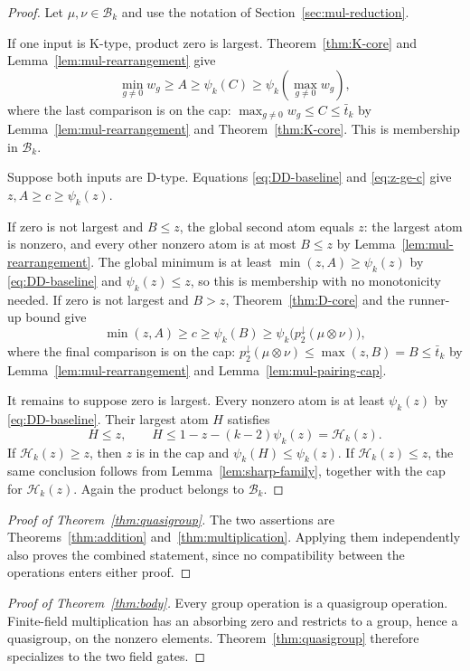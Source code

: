 \documentclass[11pt]{article}
\theoremstyle{definition}
\theoremstyle{remark}
\newcommand{\body}{\mathcal{B}}
\newcommand{\down}{\downarrow}
\begin{document}
\begin{proof}
Let $\mu,\nu\in\body_k$ and use the notation of
Section~\ref{sec:mul-reduction}.

If one input is K-type, product zero is largest.  Theorem~\ref{thm:K-core}
and Lemma~\ref{lem:mul-rearrangement} give
\[
 \min_{g\ne0}w_g\ge A\ge\psi_k(C)
 \ge\psi_k\left(\max_{g\ne0}w_g\right),
\]
where the last comparison is on the cap:
$\max_{g\ne0}w_g\le C\le\bar t_k$ by Lemma~\ref{lem:mul-rearrangement}
and Theorem~\ref{thm:K-core}.  This is membership in $\body_k$.

Suppose both inputs are D-type.  Equations \eqref{eq:DD-baseline} and
\eqref{eq:z-ge-c} give $z,A\ge c\ge\psi_k(z)$.

If zero is not largest and $B\le z$, the global second atom equals $z$:
the largest atom is nonzero, and every other nonzero atom is at most
$B\le z$ by Lemma~\ref{lem:mul-rearrangement}.  The global minimum is at
least $\min(z,A)\ge\psi_k(z)$ by \eqref{eq:DD-baseline} and
$\psi_k(z)\le z$, so this is membership with no monotonicity needed.
If zero is not largest and $B>z$, Theorem~\ref{thm:D-core}
and the runner-up bound give
\[
 \min(z,A)\ge c\ge\psi_k(B)
 \ge\psi_k\bigl(p_2^\down(\mu\otimes\nu)\bigr),
\]
where the final comparison is on the cap:
$p_2^\down(\mu\otimes\nu)\le\max(z,B)=B\le\bar t_k$ by
Lemma~\ref{lem:mul-rearrangement} and Lemma~\ref{lem:mul-pairing-cap}.

It remains to suppose zero is largest.  Every nonzero atom is at least
$\psi_k(z)$ by \eqref{eq:DD-baseline}.  Their largest atom $H$ satisfies
\[
 H\le z,\qquad H\le1-z-(k-2)\psi_k(z)=\mathcal H_k(z).
\]
If $\mathcal H_k(z)\ge z$, then $z$ is in the cap and
$\psi_k(H)\le\psi_k(z)$.  If $\mathcal H_k(z)\le z$, the same conclusion
follows from Lemma~\ref{lem:sharp-family}, together with the cap for
$\mathcal H_k(z)$.  Again the product belongs to $\body_k$.
\end{proof}

\begin{proof}[Proof of Theorem~\ref{thm:quasigroup}]
The two assertions are Theorems~\ref{thm:addition}
and~\ref{thm:multiplication}.  Applying them independently also proves the
combined statement, since no compatibility between the operations enters
either proof.
\end{proof}

\begin{proof}[Proof of Theorem~\ref{thm:body}]
Every group operation is a quasigroup operation.  Finite-field
multiplication has an absorbing zero and restricts to a group, hence a
quasigroup, on the nonzero elements.  Theorem~\ref{thm:quasigroup} therefore
specializes to the two field gates.
\end{proof}
\end{document}
